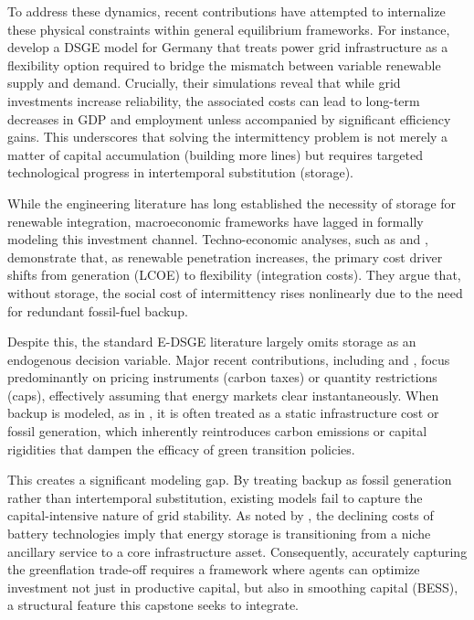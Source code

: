 	To address these dynamics, recent contributions have attempted to internalize these physical constraints within general equilibrium frameworks. For instance, \citet{schreiner2020investing} develop a DSGE model for Germany that treats power grid infrastructure as a flexibility option required to bridge the mismatch between variable renewable supply and demand. Crucially, their simulations reveal that while grid investments increase reliability, the associated costs can lead to long-term decreases in GDP and employment unless accompanied by significant efficiency gains. This underscores that solving the intermittency problem is not merely a matter of capital accumulation (building more lines) but requires targeted technological progress in intertemporal substitution (storage).
	
	While the engineering literature has long established the necessity of storage for renewable integration, macroeconomic frameworks have lagged in formally modeling this investment channel. Techno-economic analyses, such as \citet{zakeri2015} and \citet{lund2015}, demonstrate that, as renewable penetration increases, the primary cost driver shifts from generation (LCOE) to flexibility (integration costs). They argue that, without storage, the social cost of intermittency rises nonlinearly due to the need for redundant fossil-fuel backup.
	
	Despite this, the standard E-DSGE literature largely omits storage as an endogenous decision variable. Major recent contributions, including \citet{batten2020} and \citet{annicchiarico2021}, focus predominantly on pricing instruments (carbon taxes) or quantity restrictions (caps), effectively assuming that energy markets clear instantaneously. When backup is modeled, as in \citet{schreiner2020investing}, it is often treated as a static infrastructure cost or fossil generation, which inherently reintroduces carbon emissions or capital rigidities that dampen the efficacy of green transition policies.
	
	This creates a significant modeling gap. By treating backup as fossil generation rather than intertemporal substitution, existing models fail to capture the capital-intensive nature of grid stability. As noted by \citet{kittner2017}, the declining costs of battery technologies imply that energy storage is transitioning from a niche ancillary service to a core infrastructure asset. Consequently, accurately capturing the greenflation trade-off requires a framework where agents can optimize investment not just in productive capital, but also in smoothing capital (BESS), a structural feature this capstone seeks to integrate.
	
